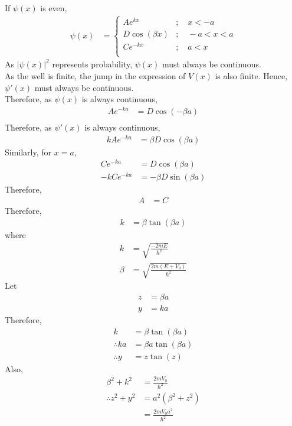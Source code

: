 \documentclass[titlepage, fleqn, a4paper, 12pt, twoside]{article}
\theoremstyle{definition}
\theoremstyle{theorem}
\begin{document}
If $\psi(x)$ is even,
\begin{align*}
	\psi(x) &=
		\begin{cases}
			A e^{k x} &;\quad x < -a\\
			D \cos(\beta x) &;\quad -a < x < a\\
			C e^{-k x} &;\quad a < x\\
		\end{cases}
\end{align*}
As $\left| \psi(x) \right|^2$ represents probability, $\psi(x)$ must always be continuous.\\
As the well is finite, the jump in the expression of $V(x)$ is also finite.
Hence, $\psi'(x)$ must always be continuous.\\
Therefore, as $\psi(x)$ is always continuous,
\begin{align*}
	A e^{-k a} &= D \cos(-\beta a)\\
\end{align*}
Therefore, as $\psi'(x)$ is always continuous,
\begin{align*}
	k A e^{-k a} &= \beta D \cos(\beta a)
\end{align*}
Similarly, for $x = a$,
\begin{align*}
	C e^{-k a} &= D \cos(\beta a)\\
	-k C e^{-k a} &= -\beta D \sin(\beta a)
\end{align*}
Therefore,
\begin{align*}
	A &= C
\end{align*}
Therefore,
\begin{align*}
	k &= \beta \tan(\beta a)
\end{align*}
where
\begin{align*}
	k &= \sqrt{\frac{-2 m E}{\hbar^2}}\\
	\beta &= \sqrt{\frac{2 m (E + V_0)}{\hbar^2}}
\end{align*}
Let
\begin{align*}
	z &= \beta a\\
	y &= k a
\end{align*}
Therefore,
\begin{align*}
	k &= \beta \tan(\beta a)\\
	\therefore k a &= \beta a \tan(\beta a)\\
	\therefore y &= z \tan(z)
\end{align*}
Also,
\begin{align*}
	\beta^2 + k^2 &= \frac{2 m V_0}{\hbar^2}\\
	\therefore z^2 + y^2 &= a^2 \left( \beta^2 + z^2 \right)\\
	&= \frac{2 m V_0 a^2}{\hbar^2}
\end{align*}
\end{document}
